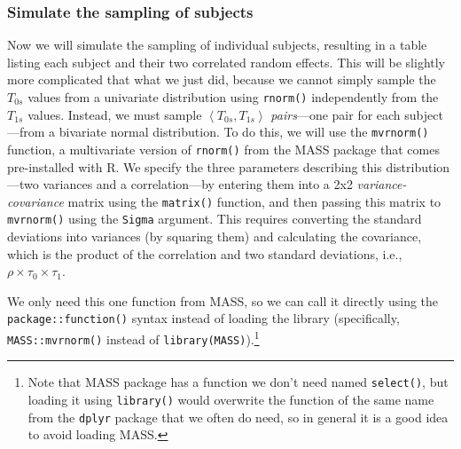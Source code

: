 \documentclass[
  english,
  doc,floatsintext]{apa6}
\begin{document}
\hypertarget{simulate-the-sampling-of-subjects}{%
\subsubsection{Simulate the sampling of subjects}\label{simulate-the-sampling-of-subjects}}

Now we will simulate the sampling of individual subjects, resulting in a table listing each subject and their two correlated random effects. This will be slightly more complicated that what we just did, because we cannot simply sample the \(T_{0s}\) values from a univariate distribution using \texttt{rnorm()} independently from the \(T_{1s}\) values. Instead, we must sample \(\left<T_{0s}, T_{1s}\right>\) \emph{pairs}---one pair for each subject---from a bivariate normal distribution. To do this, we will use the \texttt{mvrnorm()} function, a multivariate version of \texttt{rnorm()} from the MASS package that comes pre-installed with R. We specify the three parameters describing this distribution---two variances and a correlation---by entering them into a 2x2 \emph{variance-covariance} matrix using the \texttt{matrix()} function, and then passing this matrix to \texttt{mvrnorm()} using the \texttt{Sigma} argument. This requires converting the standard deviations into variances (by squaring them) and calculating the covariance, which is the product of the correlation and two standard deviations, i.e., \(\rho \times \tau_0 \times \tau_1\).

We only need this one function from MASS, so we can call it directly using the \texttt{package::function()} syntax instead of loading the library (specifically, \texttt{MASS::mvrnorm()} instead of \texttt{library(MASS)}).\footnote{Note that MASS package has a function we don't need named \texttt{select()}, but loading it using \texttt{library()} would overwrite the function of the same name from the \texttt{dplyr} package that we often do need, so in general it is a good idea to avoid loading MASS.}
\end{document}

